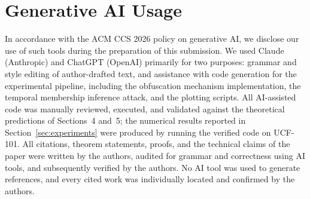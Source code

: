 \documentclass[sigconf,anonymous, review]{acmart}
\begin{document}
\section{Generative AI Usage}
\label{app:gen_ai}

In accordance with the ACM CCS 2026 policy on generative AI, we disclose our use of such tools during the preparation of this submission. We used Claude (Anthropic) and ChatGPT (OpenAI) primarily for two purposes: grammar and style editing of author-drafted text, and assistance with code generation for the experimental pipeline, including the obfuscation mechanism implementation, the temporal membership inference attack, and the plotting scripts. All AI-assisted code was manually reviewed, executed, and validated against the theoretical predictions of Sections~4 and~5; the numerical results reported in Section~\ref{sec:experiments} were produced by running the verified code on UCF-101. All citations, theorem statements, proofs, and the technical claims of the paper were written by the authors, audited for grammar and correctness using AI tools, and subsequently verified by the authors. No AI tool was used to generate references, and every cited work was individually located and confirmed by the authors.
\end{document}
